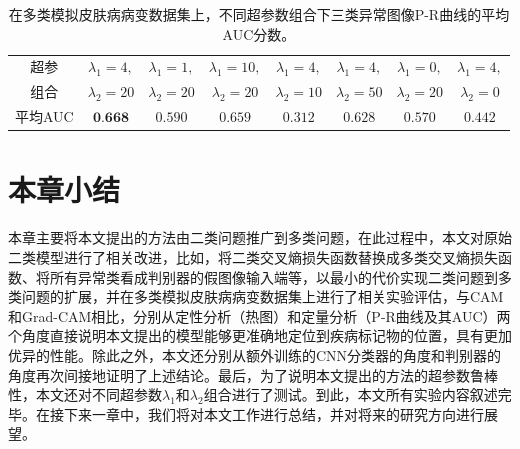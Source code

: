 \begin{table}[H]
	\centering
	\caption[不同超参数组合下三类异常图像P-R曲线的平均AUC分数]{在多类模拟皮肤病病变数据集上，不同超参数组合下三类异常图像P-R曲线的平均AUC分数。}
	\label{tab:simulated_skin_diff_parameters}
		\begin{tabular}{c|c|c|c|c|c|c|c}
			\toprule[2pt]
			
			超参& $\lambda_{1}=4,$ & $\lambda_{1}=1,$& $\lambda_{1}=10,$&
			$\lambda_{1}=4,$ & $\lambda_{1}=4,$ &
			$\lambda_{1}=0,$ &
			$\lambda_{1}=4,$\\
			组合		  & 
			$\lambda_{2}=20$ & $\lambda_{2}=20$ &
			$\lambda_{2}=20$ & $\lambda_{2}=10$ & $\lambda_{2}=50$ &
			$\lambda_{2}=20$&
			$\lambda_{2}=0$ \\
			\midrule[2pt]



			平均AUC	& $\textbf{0.668}$ &	$0.590 $ & $0.659$ & $0.312$ & $0.628$& $0.570$ &	$0.442$ \\
			\bottomrule[2pt]
		\end{tabular}
\end{table}
\section{本章小结}
本章主要将本文提出的方法由二类问题推广到多类问题，在此过程中，本文对原始二类模型进行了相关改进，比如，将二类交叉熵损失函数替换成多类交叉熵损失函数、将所有异常类看成判别器的假图像输入端等，以最小的代价实现二类问题到多类问题的扩展，并在多类模拟皮肤病病变数据集上进行了相关实验评估，与CAM和Grad-CAM相比，分别从定性分析（热图）和定量分析（P-R曲线及其AUC）两个角度直接说明本文提出的模型能够更准确地定位到疾病标记物的位置，具有更加优异的性能。除此之外，本文还分别从额外训练的CNN分类器的角度和判别器的角度再次间接地证明了上述结论。最后，为了说明本文提出的方法的超参数鲁棒性，本文还对不同超参数$\lambda_{1}$和$\lambda_{2}$组合进行了测试。到此，本文所有实验内容叙述完毕。在接下来一章中，我们将对本文工作进行总结，并对将来的研究方向进行展望。

